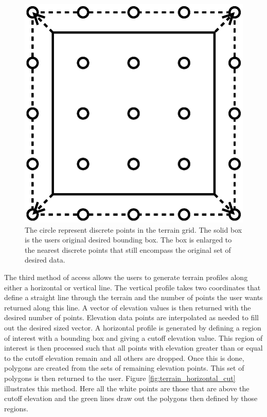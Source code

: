 \begin{figure}[ht]
\centering
\includegraphics{images/network_vis/terrain_bounding_box.eps}
  \caption{The circle represent discrete points in the terrain grid.  The solid box is the users original desired bounding box.  The box is enlarged to the nearest discrete points that still encompass the original set of desired data.}
\label{fig:terrain_bb}
\end{figure}

The third method of access allows the users to generate terrain profiles along either a horizontal or vertical line.  The vertical profile takes two coordinates that define a straight line through the terrain and the number of points the user wants returned along this line.  A vector of elevation values is then returned with the desired number of points.  Elevation data points are interpolated as needed to fill out the desired sized vector.  A horizontal profile is generated by defining a region of interest with a bounding box and giving a cutoff elevation value.  This region of interest is then processed such that all points with elevation greater than or equal to the cutoff elevation remain and all others are dropped.  Once this is done, polygons are created from the sets of remaining elevation points.  This set of polygons is then returned to the user.  Figure \ref{fig:terrain_horizontal_cut} illustrates this method.  Here all the white points are those that are above the cutoff elevation and the green lines draw out the polygons then defined by those regions.

